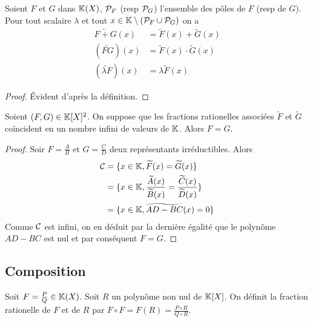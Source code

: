\begin{prop}
  Soient \(F\) et \(G\) dans \(\K(X)\), \(\P_F\) (resp \(\P_G\)) l'ensemble des pôles de \(F\) (resp de \(G\)). Pour tout scalaire \(\lambda\) et tout \(x \in \K\setminus(\P_F \cup \P_G)\) on a
  \begin{align}
    \widetilde{F+G}(x) &= \widetilde{F}(x) + \widetilde{G}(x) \\
    (\widetilde{FG})(x)&= \widetilde{F}(x) \cdot \widetilde{G}(x) \\
    (\widetilde{\lambda F})(x)&=\lambda \widetilde{F}(x)
  \end{align}
\end{prop}
\begin{proof}
  Évident d'après la définition.
\end{proof}

\begin{prop}
  Soient \((F,G) \in \K[X]^2\). On suppose que les fractions rationelles associées \(\widetilde{F}\) et \(\widetilde{G}\) coïncident en un nombre infini de valeurs de \(\K\). Alors \(F=G\).
\end{prop}
\begin{proof}
  Soir \(F=\frac{A}{B}\) et \(G=\frac{C}{D}\) deux représentants irréductibles. Alors
  \begin{align}
    \courbe &=\{x \in \K, \widetilde{F}(x)=\widetilde{G}(x)\} \\
    &=\{x \in \K, \frac{\widetilde{A}(x)}{\widetilde{B}(x)}=\frac{\widetilde{C}(x)}{\widetilde{D}(x)}\} \\
    &=\{x \in \K, \widetilde{AD-BC}(x)=0 \}\\
  \end{align}
  Comme \(\courbe\) est infini, on en déduit par la dernière égalité que le polynôme \(AD-BC\) est nul et par conséquent \(F=G\).
\end{proof}

\subsection{Composition}

\begin{defdef}
  Soit \(F=\frac{P}{Q} \in \K(X)\). Soit \(R\) un polynôme non nul de \(\K[X]\). On définit la fraction rationelle de \(F\) et de \(R\) par \(F \circ F = F(R) = \frac{P \circ R}{Q \circ R}\).
\end{defdef}

